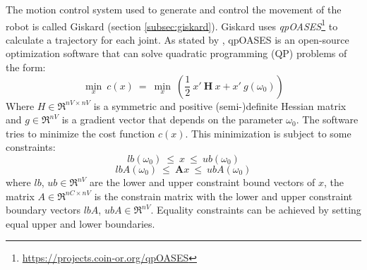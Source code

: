 The motion control system used  to generate and control the movement of the robot is called Giskard (section \ref{subsec:giskard}). Giskard uses \textit{qpOASES}\footnote{\url{https://projects.coin-or.org/qpOASES}}  to calculate a trajectory for each joint. As stated by \citet{qpoases},  qpOASES is an open-source optimization software that can solve quadratic programming (QP) problems of the form:
\begin{equation}
\underset{x}{\min}\ c(x)\ =\  \underset{x}{\min}\ \left( \frac{1}{2} \ x' \ \textbf{H} \ x + x' \ g(\omega_{0}) \right)
\label{eq:cost_in}
\end{equation}
Where $H \in \Re^{nV\times nV}$ is a symmetric and positive (semi-)definite Hessian matrix and $g \in \Re^{nV}$ is a gradient vector that depends on the parameter $\omega_{0}$. The software tries to minimize the cost function $c(x)$. This minimization is subject to some constraints:
$$lb(\omega_{0})\ \leq\ x\ \leq\ ub(\omega_{0})$$
$$lbA(\omega_{0})\ \leq\ \textbf{A}x\ \leq\ ubA(\omega_{0})$$
where $lb$, $ub \in \Re^{nV}$ are the lower and upper constraint bound vectors of $x$, the matrix $A \in \Re^{nC\times nV}$ is the constrain matrix with the lower and upper constraint boundary vectors $lbA$, $ubA \in \Re^{nV}$. Equality constraints can be achieved by setting equal upper and lower boundaries.
 
